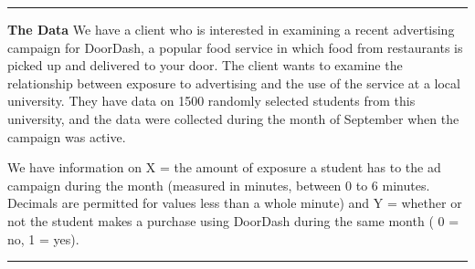 \documentclass[11pt]{article}
\begin{document}
\begin{titlepage}



\end{titlepage}

\pagebreak

$\:$ \\
\thispagestyle{empty}
\pagebreak

\setcounter{page}{1}

\rule{\textwidth}{0.5pt}

\textbf{The Data} We have a client who is interested in examining a recent advertising campaign for DoorDash, a popular food service in which food from restaurants is picked up and delivered to your door. The client wants to examine the relationship between exposure to advertising and the use of the service at a local university. They have data on 1500 randomly selected students from this university, and the data were collected during the month of September when the campaign was active. 

We have information on X = the amount of exposure a student has to the ad campaign  during the month (measured in minutes, between 0 to 6 minutes. Decimals are permitted for values less than a whole minute) and Y = whether or not the student makes a purchase using DoorDash during the same month ( 0 = no, 1 = yes).

\rule{\textwidth}{1pt}
\end{document}
